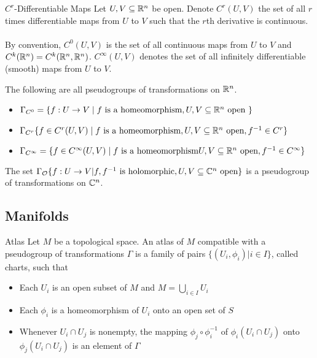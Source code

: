 \documentclass[a4paper]{article}
\begin{document}
\begin{defn}{$C^r$-Differentiable Maps}{} Let $U,V\subseteq\mathbb{R}^n$ be open. Denote $C^r(U,V)$ the set of all $r$ times differentiable maps from $U$ to $V$ such that the $r$th derivative is continuous. \\~\\
By convention, $C^0(U,V)$ is the set of all continuous maps from $U$ to $V$ and $C^k(\mathbb{R}^n)=C^k(\mathbb{R}^n,\mathbb{R}^n)$. $C^\infty(U,V)$ denotes the set of all infinitely differentiable (smooth) maps from $U$ to $V$. 
\end{defn}

\begin{prp}{}{} The following are all pseudogroups of transformations on $\mathbb{R}^n$. 
\begin{itemize}
\item $\Gamma_{C^0}=\{f:U\to V\;|\;f\text{ is a homeomorphism}, U,V\subseteq\mathbb{R}^n\text{ open }\}$
\item $\Gamma_{C^r}\{f\in C^r(U,V)\;|\;f\text{ is a homeomorphism}, U,V\subseteq\mathbb{R}^n\text{ open}, f^{-1}\in C^r\}$
\item $\Gamma_{C^\infty}=\{f\in C^\infty(U,V)\;|\;f\text{ is a homeomorphism}U,V\subseteq\mathbb{R}^n\text{ open},f^{-1}\in C^\infty\}$
\end{itemize}
\end{prp}

\begin{prp}{}{} The set $\Gamma_{\mathcal{O}}\{f:U\to V|f,f^{-1}\text{ is holomorphic}, U,V\subseteq\mathbb{C}^n\text{ open}\}$ is a pseudogroup of transformations on $\mathbb{C}^n$. 
\end{prp}

\subsection{Manifolds}
\begin{defn}{Atlas}{} Let $M$ be a topological space. An atlas of $M$ compatible with a pseudogroup of transformations $\Gamma$ is a family of pairs $\{(U_i,\phi_i)|i\in I\}$, called charts, such that 
\begin{itemize}
\item Each $U_i$ is an open subset of $M$ and $M=\bigcup_{i\in I}U_i$
\item Each $\phi_i$ is a homeomorphism of $U_i$ onto an open set of $S$
\item Whenever $U_i\cap U_j$ is nonempty, the mapping $\phi_j\circ\phi_i^{-1}$ of $\phi_i(U_i\cap U_j)$ onto $\phi_j(U_i\cap U_j)$ is an element of $\Gamma$
\end{itemize}
\end{defn}
\end{document}
